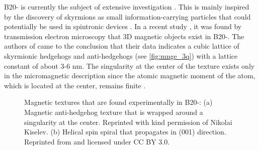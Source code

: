 \documentclass [a4paper, 12pt]{article}
\begin{document}
B20- is currently the subject of extensive
investigation
\cite{kanazawa_large_2011,kanazawa_possible_2012,grigoriev_chiral_2013,tanigaki_real-space_2015,martin_magnetic_2016}.
This is mainly inspired by the discovery of skyrmions as small information-carrying particles
that could potentially be used in spintronic devices \cite{fert_magnetic_2017}.
In a recent study \cite{tanigaki_real-space_2015}, it was 
found by transmission electron microscopy that 3D magnetic
objects exist in B20-. The authors of \cite{tanigaki_real-space_2015}
came to the conclusion that their data indicates a
cubic lattice of skyrmionic hedgehogs
and anti-hedgehogs (see \cref{fig:mnge_3q}) 
with a lattice constant of about 3-6 nm.
The singularity at the center of the texture exists only in the micromagnetic description since the
atomic magnetic moment of the atom, which is located at the center,
remains finite \cite{feldtkeller_continuous_2017}.
\begin{figure}[htb]
	\hfill
	\hfill
 \caption{Magnetic textures that are found experimentally in B20-: (a) 
	Magnetic anti-hedgehog texture that is wrapped around a singularity at the center.
	Reprinted with kind permission of Nikolai Kiselev. (b) Helical
	spin spiral that propagates in (001) direction. Reprinted from \cite{rybakov_new_2016} and
	licensed under CC BY 3.0.}
\end{figure}
\end{document}
